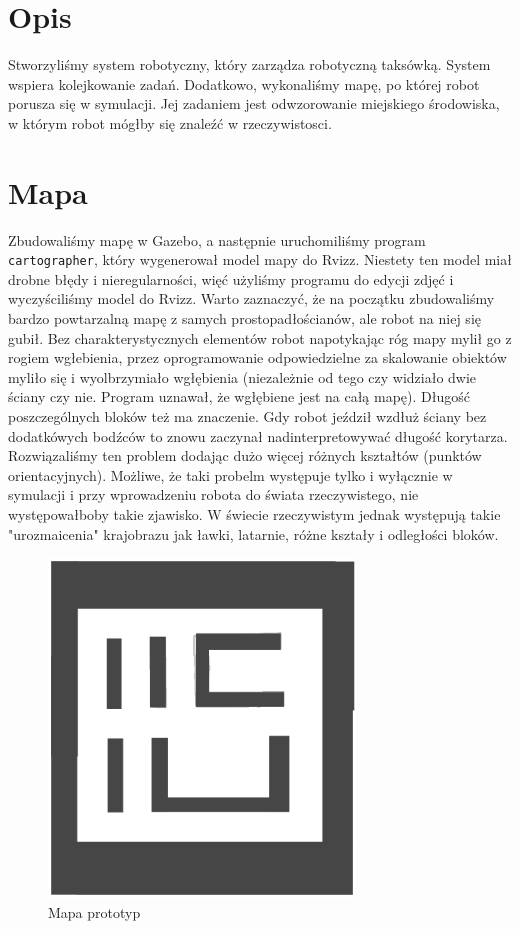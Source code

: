 \documentclass[12pt]{article}
\newcommand{\vsp}{\vspace{0.5cm}}
\begin{document}


\section{Opis}

Stworzyliśmy system robotyczny, który zarządza robotyczną taksówką. System wspiera kolejkowanie zadań. Dodatkowo, wykonaliśmy mapę, po której robot porusza się w symulacji. Jej zadaniem jest odwzorowanie miejskiego środowiska, w którym robot mógłby się znaleźć w rzeczywistosci. 


\vsp
\section{Mapa}

Zbudowaliśmy mapę w Gazebo, a następnie uruchomiliśmy program \texttt{cartographer}, który wygenerował model mapy do Rvizz. Niestety ten model miał drobne błędy i nieregularności, więć użyliśmy programu do edycji zdjęć i wyczyściliśmy model do Rvizz. Warto zaznaczyć, że na początku zbudowaliśmy bardzo powtarzalną mapę z samych prostopadłościanów, ale robot na niej się gubił. Bez charakterystycznych elementów robot napotykając róg mapy mylił go z rogiem wgłebienia, przez oprogramowanie odpowiedzielne za skalowanie obiektów myliło się i wyolbrzymiało wgłębienia (niezależnie od tego czy widziało dwie ściany czy nie. Program uznawał, że wgłębiene jest na całą mapę). Długość poszczególnych bloków też ma znaczenie. Gdy robot jeździł wzdłuż ściany bez dodatkówych bodźców to znowu zaczynał nadinterpretowywać długość korytarza. Rozwiązaliśmy ten problem dodając dużo więcej różnych kształtów (punktów orientacyjnych). Możliwe, że taki probelm występuje tylko i wyłącznie w symulacji i przy wprowadzeniu robota do świata rzeczywistego, nie występowałboby takie zjawisko. W świecie rzeczywistym jednak występują takie "urozmaicenia" krajobrazu jak ławki, latarnie, różne kształy i odległości bloków.
 
\vsp\vsp

\begin{figure}[!htb]
    \centering
    \includegraphics[height=9cm]{./images/RVIZOMAP.png}
    \caption{Mapa prototyp}
\end{figure}
\end{document}
